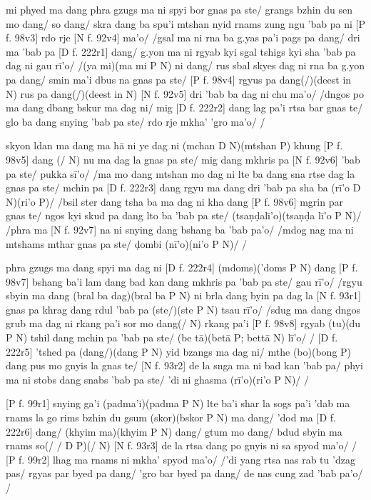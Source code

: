 \documentclass[naipra.tex]{subfiles}
\begin{document}
mi phyed ma dang phra gzugs ma ni spyi bor gnas pa ste/ grangs bzhin du sen mo dang/ so dang/ skra dang ba spu'i mtshan nyid rnams zung ngu 'bab pa ni [P f. 98v3] rdo rje [N f. 92v4] ma'o/ /gsal ma ni rna ba g.yas pa'i pags pa dang/ dri ma 'bab pa [D f. 222r1] dang/ g.yon ma ni rgyab kyi sgal tshigs kyi sha 'bab pa dag ni gau rī'o/ /(ya mi)(ma mi P N) ni dang/ rus sbal skyes dag ni rna ba g.yon pa dang/ smin ma'i dbus na gnas pa ste/ [P f. 98v4] rgyus pa dang(/)(deest in N) rus pa dang(/)(deest in N) [N f. 92v5] dri 'bab ba dag ni chu ma'o/ /dngos po ma dang dbang bskur ma dag ni/ mig [D f. 222r2] dang lag pa'i rtsa bar gnas te/ glo ba dang snying 'bab pa ste/ rdo rje mkha' 'gro ma'o/ /

skyon ldan ma dang ma hā ni ye dag ni (mchan D N)(mtshan P) khung [P f. 98v5] dang (/ N) nu ma dag la gnas pa ste/ mig dang mkhris pa [N f. 92v6] 'bab pa ste/ pukka sī'o/ /ma mo dang mtshan mo dag ni lte ba dang sna rtse dag la gnas pa ste/ mchin pa [D f. 222r3] dang rgyu ma dang dri 'bab pa sha ba (rī'o D N)(ri'o P)/ /bsil ster dang tsha ba ma dag ni kha dang [P f. 98v6] mgrin par gnas te/ ngos kyi skud pa dang lto ba 'bab pa ste/ (tsaṇḍalī'o)(tsaṇḍa lī'o P N)/ /phra ma [N f. 92v7] na ni snying dang bshang ba 'bab pa'o/ /mdog nag ma ni mtshams mthar gnas pa ste/ ḍombi (nī'o)(ni'o P N)/ /

phra gzugs ma dang spyi ma dag ni [D f. 222r4] (mdoms)('doms P N) dang [P f. 98v7] bshang ba'i lam dang bad kan dang mkhris pa 'bab pa ste/ gau rī'o/ /rgyu sbyin ma dang (bral ba dag)(bral ba P N) ni brla dang byin pa dag la [N f. 93r1] gnas pa khrag dang rdul 'bab pa (ste/)(ste P N) tsau rī'o/ /sdug ma dang dngos grub ma dag ni rkang pa'i sor mo dang(/ N) rkang pa'i [P f. 98v8] rgyab (tu)(du P N) tshil dang mchin pa 'bab pa ste/ (be tā)(betā P; bettā N) lī'o/ / [D f. 222r5] 'tshed pa (dang/)(dang P N) yid bzangs ma dag ni/ mthe (bo)(bong P) dang pus mo gnyis la gnas te/ [N f. 93r2] de la snga ma ni bad kan 'bab pa/ phyi ma ni stobs dang snabs 'bab pa ste/ 'di ni ghasma (rī'o)(ri'o P N)/ /

[P f. 99r1] snying ga'i (padma'i)(padma P N) lte ba'i shar la sogs pa'i 'dab ma rnams la go rims bzhin du gsum (skor)(bskor P N) ma dang/ 'dod ma [D f. 222r6] dang/ (khyim ma)(khyim P N) dang/ gtum mo dang/ bdud sbyin ma rnams so(/ / D P)(/ N) [N f. 93r3] de la rtsa dang po gnyis ni sa spyod ma'o/ / [P f. 99r2] lhag ma rnams ni mkha' spyod ma'o/ /'di yang rtsa nas rab tu 'dzag pas/ rgyas par byed pa dang/ 'gro bar byed pa dang/ de nas cung zad 'bab pa'o/ /
\end{document}
